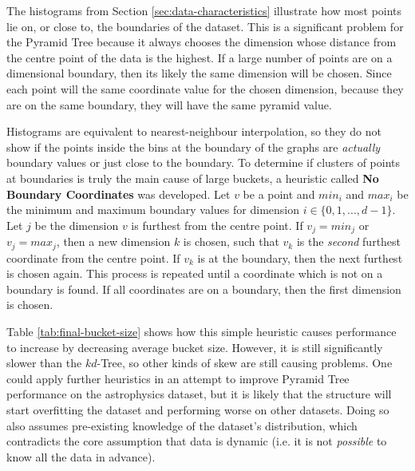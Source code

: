 The histograms from Section \ref{sec:data-characteristics} illustrate how most points lie on, or close to, the boundaries of the dataset. This is a significant problem for the Pyramid Tree because it always chooses the dimension whose distance from the centre point of the data is the highest. If a large number of points are on a dimensional boundary, then its likely the same dimension will be chosen. Since each point will the same coordinate value for the chosen dimension, because they are on the same boundary, they will have the same pyramid value.

\begin{table}
	\centering
	\caption{Pyramid Tree Bucket Size Statistics with Different Dimensions of Astrophysics Dataset}
	\label{tab:final-bucket-size}
\end{table}

Histograms are equivalent to nearest-neighbour interpolation, so they do not show if the points inside the bins at the boundary of the graphs are \textit{actually} boundary values or just close to the boundary. To determine if clusters of points at boundaries is truly the main cause of large buckets, a heuristic called \textbf{No Boundary Coordinates} was developed. Let $v$ be a point and $min_i$ and $max_i$ be the minimum and maximum boundary values for dimension $i \in \lbrace 0, 1, ..., d - 1 \rbrace$. Let $j$ be the dimension $v$ is furthest from the centre point. If $v_j = min_j$ or $v_j = max_j$, then a new dimension $k$ is chosen, such that $v_k$ is the \textit{second} furthest coordinate from the centre point. If $v_k$ is at the boundary, then the next furthest is chosen again. This process is repeated until a coordinate which is not on a boundary is found. If all coordinates are on a boundary, then the first dimension is chosen.

Table \ref{tab:final-bucket-size} shows how this simple heuristic causes performance to increase by decreasing average bucket size. However, it is still significantly slower than the $kd$-Tree, so other kinds of skew are still causing problems. One could apply further heuristics in an attempt to improve Pyramid Tree performance on the astrophysics dataset, but it is likely that the structure will start overfitting the dataset and performing worse on other datasets. Doing so also assumes pre-existing knowledge of the dataset's distribution,  which contradicts the core assumption that data is dynamic (i.e. it is not \textit{possible} to know all the data in advance).

